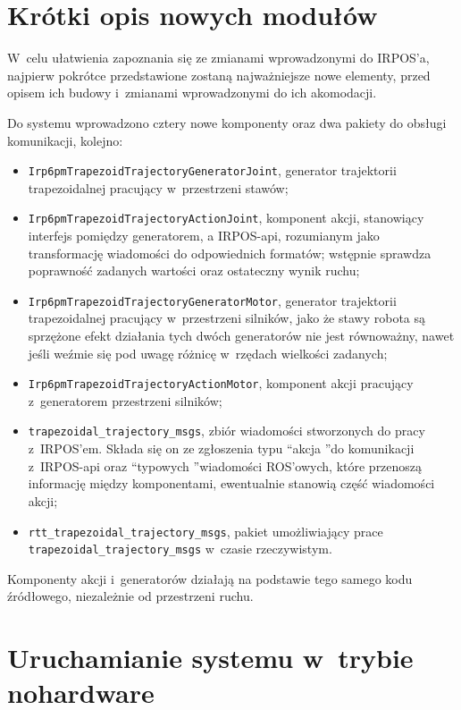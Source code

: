 \documentclass[a4paper, 12pt]{article}
\begin{document}
	\section{Krótki opis nowych modułów}
	\label{sec:shortMod}
	
	W~celu ułatwienia zapoznania się ze zmianami wprowadzonymi do IRPOS'a, najpierw pokrótce przedstawione zostaną najważniejsze nowe elementy, przed opisem ich budowy i~zmianami wprowadzonymi do ich akomodacji.
	\par 
	Do systemu wprowadzono cztery nowe komponenty oraz dwa pakiety do obsługi komunikacji, kolejno: 
		\begin{itemize}
		\item \texttt{Irp6pmTrapezoidTrajectoryGeneratorJoint}, generator trajektorii trapezoidalnej pracujący w~przestrzeni stawów;
		\item \texttt{Irp6pmTrapezoidTrajectoryActionJoint}, komponent akcji, stanowiący interfejs pomiędzy generatorem, a IRPOS-api, rozumianym jako transformację wiadomości do odpowiednich formatów; wstępnie sprawdza poprawność zadanych wartości oraz ostateczny wynik ruchu;  
		\item \texttt{Irp6pmTrapezoidTrajectoryGeneratorMotor}, generator trajektorii trapezoidalnej pracujący w~przestrzeni silników, jako że stawy robota są sprzężone efekt działania tych dwóch generatorów nie jest równoważny, nawet jeśli weźmie się pod uwagę różnicę w~rzędach wielkości zadanych;
		\item \texttt{Irp6pmTrapezoidTrajectoryActionMotor}, komponent akcji pracujący z~generatorem przestrzeni silników; 
		\item \texttt{trapezoidal\_trajectory\_msgs}, zbiór wiadomości stworzonych do pracy z~IRPOS'em. Składa się on ze zgłoszenia typu \textquotedblleft akcja \textquotedblright do komunikacji z~IRPOS-api oraz \textquotedblleft typowych \textquotedblright wiadomości ROS'owych, które przenoszą informację między komponentami, ewentualnie stanowią część wiadomości akcji;
		\item \texttt{rtt\_trapezoidal\_trajectory\_msgs}, pakiet umożliwiający prace \linebreak \texttt{trapezoidal\_trajectory\_msgs} w~czasie rzeczywistym.
		\end{itemize}
	Komponenty akcji i~generatorów działają na podstawie tego samego kodu źródłowego, niezależnie od przestrzeni ruchu. 
	\section{Uruchamianie systemu w~trybie nohardware}
	\label{sec:boot}
	
\end{document}
